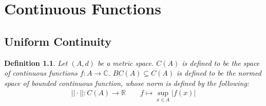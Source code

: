 \documentclass[11pt]{book}
\theoremstyle{break}
\theoremstyle{break}
\newtheorem{defn}{Definition}[corL]
\newcommand{\R}{\mathbb{R}}
\newcommand{\C}{\mathbb{C}}
\begin{document}
\newpage
\chapter{Continuous Functions}
\setcounter{section}{14}
\section[Uniform Continuity]{\color{red}Uniform Continuity\color{black}}
\begin{defn}
Let $(A,d)$ be a metric space. $C(A)$ is defined to be the space of continuous functions $f:A \to \C$. $BC(A)\subseteq C(A)$ is defined to be the normed space of bounded continuous function, whose norm is defined by the following: 
\begin{align}
||\cdot ||:C(A) \to \R \qquad f\mapsto \sup_{x\in A}|f(x)|\end{align}
\end{defn}
\end{document}

